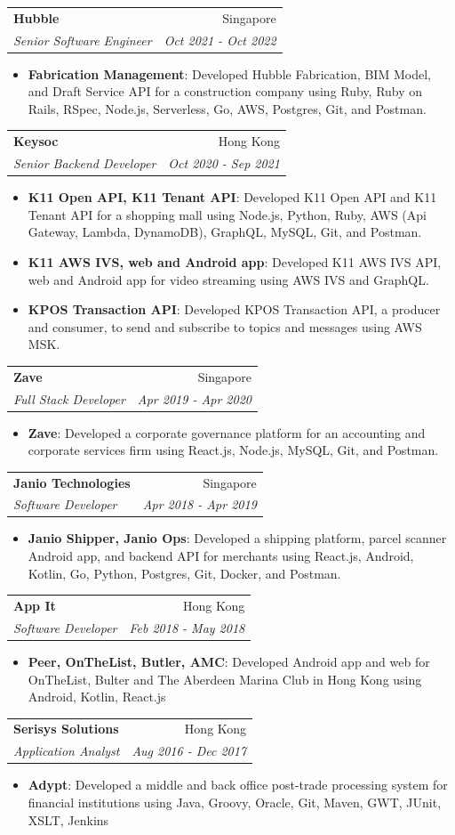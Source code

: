\documentclass[letterpaper,11pt]{article}
\makeatletter
\newcommand{\resumeItem}[2]{
  \item\small{
    \textbf{#1}{: #2 \vspace{-2pt}}
  }
}
\newcommand{\resumeSubheading}[4]{
  \vspace{-1pt}\item
    \begin{tabular*}{0.97\textwidth}[t]{l@{\extracolsep{\fill}}r}
      \textbf{#1} & #2 \\
      \textit{\small#3} & \textit{\small #4} \\
    \end{tabular*}\vspace{-5pt}
}
\newcommand{\resumeItemListStart}{\begin{itemize}}
\newcommand{\resumeItemListEnd}{\end{itemize}\vspace{-5pt}}
\makeatother
\begin{document}
    \resumeSubheading
      {Hubble}{Singapore}
      {Senior Software Engineer}{Oct 2021 - Oct 2022}
      \resumeItemListStart
        \resumeItem{Fabrication Management}
          {Developed Hubble Fabrication, BIM Model, and Draft Service API for a construction company using Ruby, Ruby on Rails, RSpec, Node.js, Serverless, Go, AWS, Postgres, Git, and Postman.}
      \resumeItemListEnd

    \resumeSubheading
      {Keysoc}{Hong Kong}
      {Senior Backend Developer}{Oct 2020 - Sep 2021}
      \resumeItemListStart
        \resumeItem{K11 Open API, K11 Tenant API}
          {Developed K11 Open API and K11 Tenant API for a shopping mall using Node.js, Python, Ruby, AWS (Api Gateway, Lambda, DynamoDB), GraphQL, MySQL, Git, and Postman.}
        \resumeItem{K11 AWS IVS, web and Android app}
          {Developed K11 AWS IVS API, web and Android app for video streaming using AWS IVS and GraphQL.}
        \resumeItem{KPOS Transaction API}
          {Developed KPOS Transaction API, a producer and consumer, to send and subscribe to topics and messages using AWS MSK.}
      \resumeItemListEnd

    \resumeSubheading
      {Zave}{Singapore}
      {Full Stack Developer}{Apr 2019 - Apr 2020}
      \resumeItemListStart
        \resumeItem{Zave}
          {Developed a corporate governance platform for an accounting and corporate services firm using React.js, Node.js, MySQL, Git, and Postman.}
      \resumeItemListEnd

    \resumeSubheading
      {Janio Technologies}{Singapore}
      {Software Developer}{Apr 2018 - Apr 2019}
      \resumeItemListStart
        \resumeItem{Janio Shipper, Janio Ops}
          {Developed a shipping platform, parcel scanner Android app, and backend API for merchants using React.js, Android, Kotlin, Go, Python, Postgres, Git, Docker, and Postman.}
      \resumeItemListEnd

    \resumeSubheading
      {App It}{Hong Kong}
      {Software Developer}{Feb 2018 - May 2018}
      \resumeItemListStart
        \resumeItem{Peer, OnTheList, Butler, AMC}
          {Developed Android app and web for OnTheList, Bulter and The Aberdeen Marina Club in Hong Kong using Android, Kotlin, React.js}
      \resumeItemListEnd

    \resumeSubheading
      {Serisys Solutions}{Hong Kong}
      {Application Analyst}{Aug 2016 - Dec 2017}
      \resumeItemListStart
        \resumeItem{Adypt}
          {Developed a middle and back office post-trade processing system for financial institutions using Java, Groovy, Oracle, Git, Maven, GWT, JUnit, XSLT, Jenkins}
      \resumeItemListEnd
      
\end{document}
